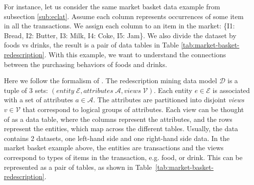 
For instance, let us consider the same market basket data example from subsection \ref{sub:eclat}.
Assume each column represents occurrences of some item in all the transactions.
We assign each column to an item in the market: \{I1: Bread, I2: Butter, I3: Milk, I4: Coke, I5: Jam\}.
We also divide the dataset by foods vs drinks, the result is a pair of data tables in Table \ref{tab:market-basket-redescription}.
With this example, we want to understand the connections between the purchasing behaviors of foods and drinks.

Here we follow the formalism of \cite{Galbrun-Methods}.
The redescription mining data model $\mathcal{D}$ is a tuple of 3 sets: $\left( entity\;\mathcal{E}, attributes\;\mathcal{A}, views\;\mathcal{V} \right)$.
Each entity $e \in \mathcal{E}$ is associated with a set of attributes $a \in \mathcal{A}$.
The attributes are partitioned into disjoint \emph{views} $v \in \mathcal{V}$ that correspond to logical groups of attributes. Each view can be thought of as a data table, where the columns represent the attributes, and the rows represent the entities, which map across the different tables.
Usually, the data contains 2 datasets, one left-hand side and one right-hand side data.
In the market basket example above, the entities are transactions and the views correspond to types of items in the transaction, e.g. food, or drink.
This can be represented as a pair of tables, as shown in Table~\ref{tab:market-basket-redescription}.

